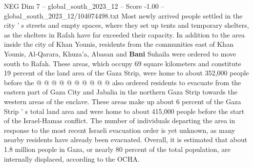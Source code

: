 \begin{textsample}{NEG Dim 7 – global\_south\_2023\_12 – Score -1.00 – global\_south\_2023\_12/104074498.txt}
Most newly arrived people settled in the city ' s streets and empty spaces, where they set up tents and temporary shelters, as the shelters in Rafah have far exceeded their capacity.
In addition to the area inside the city of Khan Younis, residents from the communities east of Khan Younis, Al-Qarara, Khuza'a, Abasan and \textbf{Bani} Suhaila were ordered to move south to Rafah.
These areas, which occupy 69 square kilometers and constitute 19 percent of the land area of the Gaza Strip, were home to about 352,000 people before the @ @ @ @ @ @ @ @ @ @ also ordered residents to evacuate from the eastern part of Gaza City and Jabalia in the northern Gaza Strip towards the western areas of the enclave.
These areas make up about 6 percent of the Gaza Strip ' s total land area and were home to about 415,000 people before the start of the Israel-Hamas conflict.
The number of individuals departing the area in response to the most recent Israeli evacuation order is yet unknown, as many nearby residents have already been evacuated.
Overall, it is estimated that about 1.8 million people in Gaza, or nearly 80 percent of the total population, are internally displaced, according to the OCHA.

\end{textsample}
